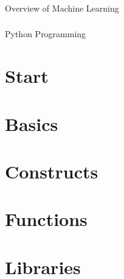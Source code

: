 


 \begin{frame}[fragile]\frametitle{}
 \begin{center}
 {\Large Overview of Machine Learning}
 \end{center}
 \end{frame}

 
 


 \begin{frame}[fragile]\frametitle{}
 \begin{center}
 {\Large Python Programming}
 \end{center}
 \end{frame}

 \section[Py Start]{Start}
 
 


\section[Basics]{Basics}



 
\section[Constructs]{Constructs}




 

 \section[Functions]{Functions}
 
 
 
  
 
 \section[Libs]{Libraries}
 
 
 


